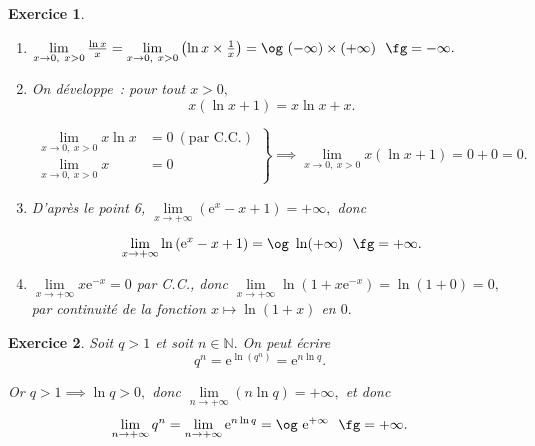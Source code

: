 \documentclass[10pt]{article}
\newtheorem{exo}{Exercice}
\begin{document}
\begin{exo}
\begin{enumerate}
Or $\lim\limits_{x\to +\infty}\frac{\ln x}{x}=0$ et $\lim\limits_{x\to +\infty}0=0,$ donc d'après le théorème des gendarmes~:
\[\lim\limits_{x\to +\infty}\frac{\ln x}{x+1}=0.\]

\item $\lim\limits_{x\to 0,~x>0}\frac{\ln x}{x}=\lim\limits_{x\to 0,~x>0}\left(\ln x\times\frac{1}{x}\right)=\text{\og}~(-\infty)\times (+\infty)~\text{ \fg}=-\infty.$
\item On développe~: pour tout $x>0,$
\[x\left(\ln x+1\right)=x\ln x+x.\]

\[
\left.
    \begin{array}{ll}
        \lim\limits_{x\to 0,~x>0}x\ln x&= 0~(\text{par C.C.}) \\
        \lim\limits_{x\to 0,~x>0}x&= 0
    \end{array}
\right \}\implies \lim\limits_{x\to 0,~x>0}x(\ln x+1)=0+0=0.
\]

\item D'après le point 6, $\lim\limits_{x\to +\infty}\left(\text{e}^{x}-x+1\right)=+\infty,$ donc

\[\lim\limits_{x\to +\infty}\ln\left(\text{e}^{x}-x+1\right)=\text{\og}~\ln(+\infty)~\text{ \fg}=+\infty.\]
\item $\lim\limits_{x\to +\infty}x\text{e}^{-x}=0$ par C.C., donc $\lim\limits_{x\to +\infty}\ln\left(1+x\text{e}^{-x}\right)=\ln(1+0)=0,$ par continuité de la fonction $x\mapsto \ln(1+x)$ en $0.$
\end{enumerate}


\end{exo}

\begin{exo}

Soit $q>1$ et soit $n\in\mathbb{N}.$ On peut écrire
\[q^n=\text{e}^{\ln\left(q^n\right)}=\text{e}^{n\ln q}.\]

Or $q>1\implies \ln q>0,$ donc $\lim\limits_{n\to +\infty}\left(n\ln q\right)=+\infty,$ et donc
\[\lim\limits_{n\to +\infty}q^n=\lim\limits_{n\to +\infty}\text{e}^{n\ln q}=\text{\og}~\text{e}^{+\infty}~\text{ \fg}=+\infty.\]




\end{exo}
\end{document}
